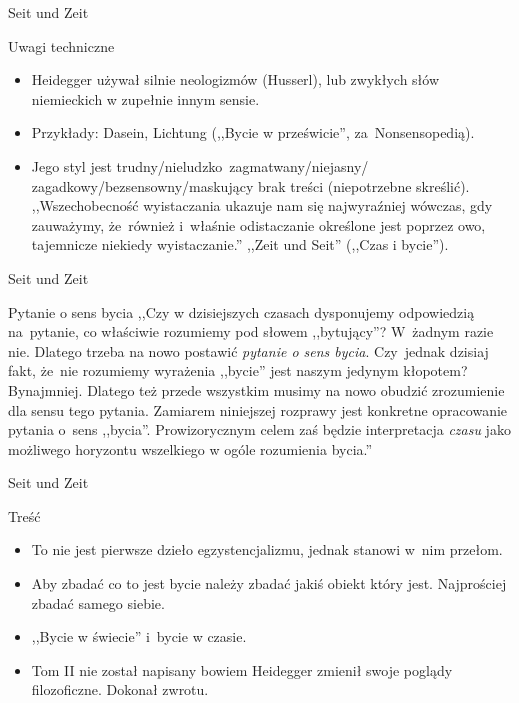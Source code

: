 \begin{frame}{Seit und Zeit}
\begin{block}{Uwagi techniczne}
\begin{itemize}
\item Heidegger używał silnie neologizmów (Husserl), lub zwykłych słów niemieckich w zupełnie innym sensie.
\item Przykłady: Dasein, Lichtung (,,Bycie w prześwicie'', za~Nonsensopedią).
\pause
\item Jego styl jest trudny/nieludzko~zagmatwany/niejasny/ zagadkowy/bezsensowny/maskujący brak treści (niepotrzebne skreślić).
\newline
,,Wszechobecność wyistaczania ukazuje nam się najwyraźniej wówczas, gdy  zauważymy, że~również i~właśnie odistaczanie określone jest poprzez owo, tajemnicze niekiedy wyistaczanie.'' ,,Zeit und Seit'' (,,Czas i bycie'').
\end{itemize}
\end{block}
\end{frame}


\begin{frame}{Seit und Zeit}
\begin{block}{Pytanie o sens bycia}
,,Czy w dzisiejszych czasach dysponujemy odpowiedzią na~pytanie, co właściwie rozumiemy pod słowem ,,bytujący''? W~żadnym razie nie. Dlatego trzeba na nowo postawić \emph{pytanie o sens bycia}. Czy~jednak dzisiaj fakt, że~nie rozumiemy wyrażenia ,,bycie'' jest naszym jedynym kłopotem? Bynajmniej. Dlatego też przede wszystkim musimy na nowo obudzić zrozumienie dla sensu tego pytania. Zamiarem niniejszej rozprawy jest konkretne opracowanie pytania o~sens ,,bycia''. Prowizorycznym celem zaś będzie interpretacja \emph{czasu} jako możliwego horyzontu wszelkiego w ogóle rozumienia bycia.''
\end{block}
\end{frame}

\begin{frame}{Seit und Zeit}
\begin{block}{Treść}
\begin{itemize}
\item To nie jest pierwsze dzieło egzystencjalizmu, jednak stanowi w~nim przełom.
\item Aby zbadać co to jest bycie należy zbadać jakiś obiekt który jest. Najprościej zbadać samego siebie.
\item ,,Bycie w świecie'' i~bycie w czasie.
\pause
\item Tom II nie został napisany bowiem Heidegger zmienił swoje poglądy filozoficzne. Dokonał zwrotu.
\end{itemize}
\end{block}
\end{frame}

